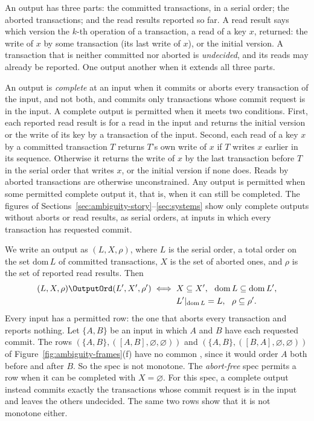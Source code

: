 An output has three parts: the committed transactions, in a serial order; the
aborted transactions; and the read results reported so far.  A read result
says which version the $k$-th operation of a transaction, a read of a key $x$,
returned: the write of $x$ by some transaction (its last write of $x$), or the
initial version.  A transaction that is
neither committed nor aborted is \emph{undecided}, and its reads may already be
reported.  One output \outrel another when it extends all three parts.

An output is \emph{complete} at an input when it commits or aborts every
transaction of the input, and not both, and commits only transactions whose
commit request is in the input.  A complete output is permitted when it meets two
conditions.  First, each reported read result is for a read in the input and
returns the initial version or the write of its key by a transaction of the
input.  Second, each read of a key $x$ by a committed transaction $T$ returns
$T$'s own write of $x$ if $T$ writes $x$ earlier in its sequence.  Otherwise it
returns the write of $x$ by the last transaction before $T$ in the serial order
that writes $x$, or the initial version if none does.  Reads by aborted
transactions are otherwise unconstrained.  Any output is permitted when some permitted complete output
\outrel it, that is, when it can still be completed.  The figures of
Sections~\ref{sec:ambiguity-story}--\ref{sec:systems} show only complete
outputs without aborts or read results, as serial orders, at inputs in which
every transaction has requested commit.

We write an output as $(L,X,\rho)$, where $L$ is the serial order, a total
order on the set $\mathrm{dom}\,L$ of committed transactions, $X$ is the set of
aborted ones, and $\rho$ is the set of reported read results.  Then
\[
  \begin{aligned}
  (L,X,\rho)\OutputOrd(L',X',\rho')
  \iff{}& X\subseteq X',\ \ \mathrm{dom}\,L\subseteq\mathrm{dom}\,L',\\
         & L'|_{\mathrm{dom}\,L}=L,\ \ \rho\subseteq\rho'.
  \end{aligned}
\]
Every input has a permitted row: the one that aborts every transaction and
reports nothing.  Let $\{A,B\}$ be an input in which $A$ and $B$ have each
requested commit.  The rows $(\{A,B\},([A,B],\varnothing,\varnothing))$ and
$(\{A,B\},([B,A],\varnothing,\varnothing))$ of
Figure~\ref{fig:ambiguity-frames}(f) have no common \outnoun, since it would
order $A$ both before and after $B$.  So the spec is not monotone.  The
\emph{abort-free} spec permits a row when it can be completed with
$X=\varnothing$.  For this spec, a complete output instead commits exactly the
transactions whose commit request is in the input and leaves the others
undecided.  The same two rows show that it is not monotone either.


